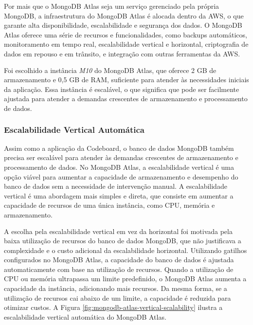 Por mais que o MongoDB Atlas seja um serviço gerenciado pela própria MongoDB, a infraestrutura do MongoDB Atlas é alocada dentro da AWS, o que garante alta disponibilidade, escalabilidade e segurança dos dados. O MongoDB Atlas oferece uma série de recursos e funcionalidades, como backups automáticos, monitoramento em tempo real, escalabilidade vertical e horizontal, criptografia de dados em repouso e em trânsito, e integração com outras ferramentas da AWS.

Foi escolhido a instância \emph{M10} do MongoDB Atlas, que oferece 2 GB de armazenamento e 0,5 GB de RAM, suficiente para atender às necessidades iniciais da aplicação. Essa instância é escalável, o que significa que pode ser facilmente ajustada para atender a demandas crescentes de armazenamento e processamento de dados. 

\subsubsection{Escalabilidade Vertical Automática}

Assim como a aplicação da Codeboard, o banco de dados MongoDB também precisa ser escalável para atender às demandas crescentes de armazenamento e processamento de dados. No MongoDB Atlas, a escalabilidade vertical é uma opção viável para aumentar a capacidade de armazenamento e desempenho do banco de dados sem a necessidade de intervenção manual. A escalabilidade vertical é uma abordagem mais simples e direta, que consiste em aumentar a capacidade de recursos de uma única instância, como CPU, memória e armazenamento.

A escolha pela escalabilidade vertical em vez da horizontal foi motivada pela baixa utilização de recursos do banco de dados MongoDB, que não justificava a complexidade e o custo adicional da escalabilidade horizontal. Utilizando gatilhos configurados no MongoDB Atlas, a capacidade do banco de dados é ajustada automaticamente com base na utilização de recursos. Quando a utilização de CPU ou memória ultrapassa um limite predefinido, o MongoDB Atlas aumenta a capacidade da instância, adicionando mais recursos. Da mesma forma, se a utilização de recursos cai abaixo de um limite, a capacidade é reduzida para otimizar custos. A Figura \ref{fig:mongodb-atlas-vertical-scalability} ilustra a escalabilidade vertical automática do MongoDB Atlas.

